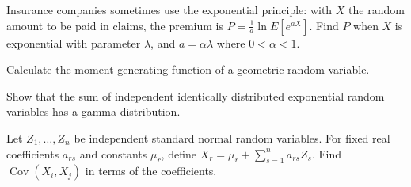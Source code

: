\begin{exercise}
\label{ex:random-variables-62}
Insurance companies sometimes use the exponential principle: with $X$ the random amount to be paid in claims, the premium is $P = \frac{1}{a}\ln E[e^{aX}]$. Find $P$ when $X$ is exponential with parameter $\lambda$, and $a = \alpha\lambda$ where $0 < \alpha < 1$.
\end{exercise}


\begin{exercise}
\label{ex:random-variables-63}
Calculate the moment generating function of a geometric random variable.
\end{exercise}


\begin{exercise}
\label{ex:random-variables-64}
Show that the sum of independent identically distributed exponential random variables has a gamma distribution.
\end{exercise}


\begin{exercise}
\label{ex:random-variables-65}
Let $Z_1,\ldots,Z_n$ be independent standard normal random variables.
For fixed real coefficients $a_{rs}$ and constants $\mu_r$, define
$X_r=\mu_r+\sum_{s=1}^n a_{rs}Z_s$. Find
$\operatorname{Cov}(X_i,X_j)$ in terms of the coefficients.
\end{exercise}

